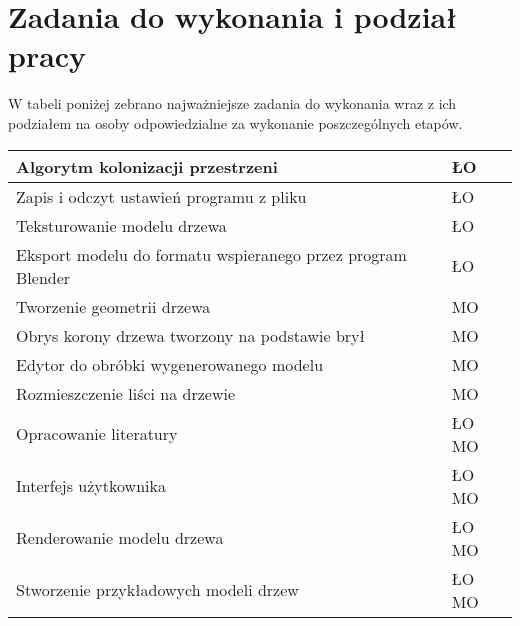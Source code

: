 \section{Zadania do wykonania i podział pracy}
W tabeli poniżej zebrano najważniejsze zadania do wykonania wraz z ich podziałem na osoby odpowiedzialne
za wykonanie poszczególnych etapów.
\begin{center}    
    \begin{longtable}{|p{120mm}|p{16mm}|} \hline
    Algorytm kolonizacji przestrzeni & ŁO \\ \hline
    Zapis i odczyt ustawień programu z pliku  & ŁO \\ \hline
    Teksturowanie modelu drzewa & ŁO \\ \hline
    Eksport modelu do formatu wspieranego przez program Blender & ŁO \\ \hline
    \hline
    Tworzenie geometrii drzewa & MO \\ \hline
    Obrys korony drzewa tworzony na podstawie brył & MO \\ \hline
    Edytor do obróbki wygenerowanego modelu  & MO \\ \hline
    Rozmieszczenie liści na drzewie & MO \\ \hline
    \hline
    Opracowanie literatury & ŁO MO  \\  \hline
    Interfejs użytkownika & ŁO MO \\ \hline
    Renderowanie modelu drzewa & ŁO MO \\ \hline
    Stworzenie przykładowych modeli drzew & ŁO MO \\ \hline
    \end{longtable}
\end{center}

